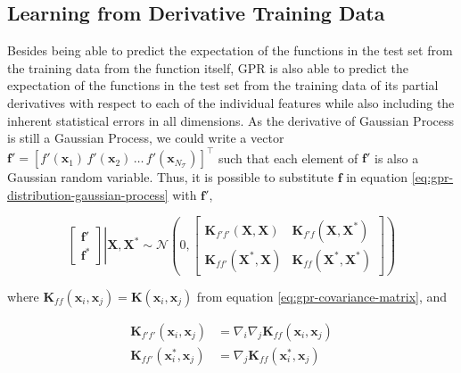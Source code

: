 \begin{spacing}{2.0}
    \subsection{Learning from Derivative Training Data}

    Besides being able to predict the expectation of the functions in the test set from the training data from the function itself, GPR is also 
    able to predict the expectation of the functions in the test set from the training data of its partial derivatives with respect to each of the 
    individual features while also including the inherent statistical errors in all dimensions. As the derivative of Gaussian Process is still a 
    Gaussian Process, we could write a vector $\mathbf{f}' = \left[f'(\mathbf{x}_1)\,f'(\mathbf{x}_2)\,\ldots\,f'(\mathbf{x}_{N_{\mathcal{T}}})\right]^{\top}$
    such that each element of $\mathbf{f}'$ is also a Gaussian random variable. Thus, it is possible to substitute $\mathbf{f}$ in equation 
    \ref{eq:gpr-distribution-gaussian-process} with $\mathbf{f}'$,

    \begin{equation}
        \left.\begin{bmatrix}
            \mathbf{f}' \\ \mathbf{f}^*
        \end{bmatrix}\right|\mathbf{X},\mathbf{X}^* \sim \mathcal{N}\left(0,
            \begin{bmatrix}
                \mathbf{K}_{f'f'}(\mathbf{X},\mathbf{X}) & \mathbf{K}_{f'f}(\mathbf{X},\mathbf{X}^*) \\
                \mathbf{K}_{ff'}(\mathbf{X}^*,\mathbf{X}) & \mathbf{K}_{ff}(\mathbf{X}^*,\mathbf{X}^*) 
            \end{bmatrix}
        \right)
        \label{eq:gpr-derivative-joint-distribution}
    \end{equation}

    where $\mathbf{K}_{ff}(\mathbf{x}_i,\mathbf{x}_j) = \mathbf{K}(\mathbf{x}_i,\mathbf{x}_j)$ from equation \ref{eq:gpr-covariance-matrix},
    and

    \begin{equation}\begin{aligned}
        \mathbf{K}_{f'f'}(\mathbf{x}_i,\mathbf{x}_j) &= \nabla_i\nabla_j\mathbf{K}_{ff}(\mathbf{x}_i,\mathbf{x}_j) \\  
        \mathbf{K}_{ff'}(\mathbf{x}_i^*,\mathbf{x}_j) &= \nabla_j\mathbf{K}_{ff}(\mathbf{x}_i^*,\mathbf{x}_j)   
    \end{aligned}\end{equation}


\end{spacing}
